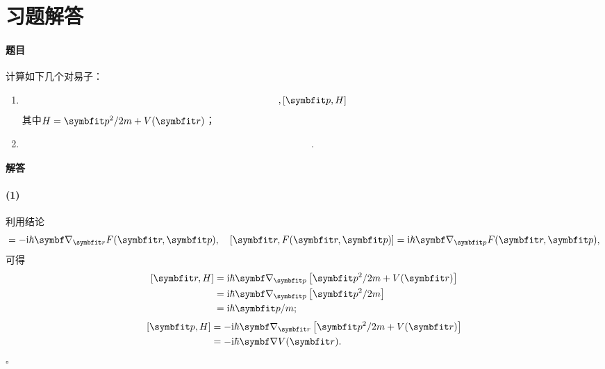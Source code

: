 
\section{习题解答}
\label{sec:exercises}


\begin{tcolorbox}[breakable, title={\textbf{两个对易子的计算}}]
    \paragraph{题目}
    计算如下几个对易子：
    \begin{enumerate}
        \item
            \begin{equation}
                [\rr,H], [\pp,H]
            \end{equation}
            其中$H=\pp^2/2m + V(\rr)$；
        \item
        \begin{equation}
                [p^2,\frac{1}{r}].
            \end{equation}
    \end{enumerate}

    \paragraph{解答}

    \paragraph{(1)}
    利用结论
    \begin{equation}
        [\pp,F(\rr,\pp)] = -\ii\hbar\del_{\rr}F(\rr,\pp),\quad [\rr,F(\rr,\pp)] = \ii\hbar\del_{\pp}F(\rr,\pp),
    \end{equation}
    可得
    \begin{equation}
    \begin{aligned}\relax
        [\rr, H]
        &= \ii\hbar\del_{\pp}\left[\pp^2/2m + V(\rr)\right] \\
        &= \ii\hbar\del_{\pp}\left[\pp^2/2m\right] \\
        &= \ii\hbar\pp/m;
    \end{aligned}
    \end{equation}
    \begin{equation}
    \begin{aligned}\relax
        [\pp, H]
        &= -\ii\hbar\del_{\rr}\left[\pp^2/2m + V(\rr)\right] \\
        &= -\ii\hbar\del V(\rr).
    \end{aligned}
    \end{equation}
    \hfill$\square$


\end{tcolorbox}
